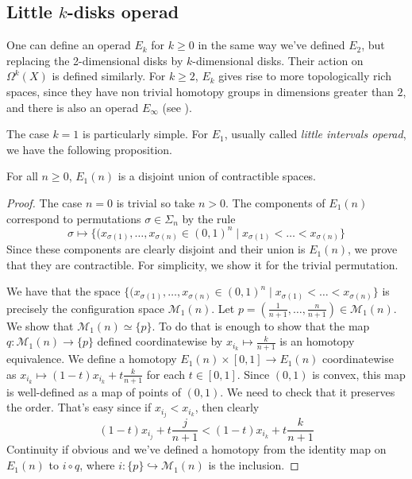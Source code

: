 \documentclass[TFM.tex]{subfiles}
\begin{document}
%
\subsection{Little $k$-disks operad}\label{intervals}

One can define an operad $E_k$ for $k\geq 0$ in the same way we've defined $E_2$, but replacing the 2-dimensional disks by $k$-dimensional disks. Their action on $\Omega^k(X)$ is defined similarly. For $k\geq 2$, $E_k$ gives rise to more topologically rich spaces, since they have non trivial homotopy groups in dimensions greater than $2$, and there is also an operad $E_\infty$ (see \cite{cuentas}). 

The case $k=1$ is particularly simple. For $E_1$, usually called \emph{little intervals operad}, we have the following proposition.

\begin{prop}\label{E1}
For all $n\geq 0$, $E_1(n)$ is a disjoint union of contractible spaces.
\end{prop}
\begin{proof}
The case $n=0$ is trivial so take $n>0$. The components of $E_1(n)$ correspond to permutations $\sigma\in\Sigma_n$ by the rule
\[
\sigma\mapsto \{(x_{\sigma(1)},\dots, x_{\sigma(n)}\in (0,1)^n\mid x_{\sigma(1)}<\dots< x_{\sigma(n)}\}
\]
Since these components are clearly disjoint and their union is $E_1(n)$, we prove that they are contractible. For simplicity, we show it for the trivial permutation. 

We have that the space $\{(x_{\sigma(1)},\dots, x_{\sigma(n)}\in (0,1)^n\mid x_{\sigma(1)}<\dots< x_{\sigma(n)}\}$  is precisely the configuration space $\mathcal{M}_1(n)$. Let $p=\left(\frac{1}{n+1},\dots, \frac{n}{n+1}\right)\in \mathcal{M}_1(n)$. We show that $\mathcal{M}_1(n)\simeq \{p\}$. To do that is enough to show that the map $q:\mathcal{M}_1(n)\to \{p\}$ defined coordinatewise by $x_{i_k}\mapsto \frac{k}{n+1}$ is an homotopy equivalence. We define a homotopy $E_1(n)\times [0,1]\to E_1(n)$ coordinatewise as $x_{i_k}\mapsto (1-t)x_{i_k}+t\frac{k}{n+1}$ for each $t\in [0,1]$. Since $(0,1)$ is convex, this map is well-defined as a map of points of $(0,1)$. We need to check that it preserves the order. That's easy since if $x_{i_j}<x_{i_k}$, then clearly 
\[
(1-t)x_{i_j}+t\frac{j}{n+1}<(1-t)x_{i_k}+t\frac{k}{n+1}
\] 
Continuity if obvious and we've defined a homotopy from the identity map on $E_1(n)$ to $i\circ q$, where $i:\{p\}\hookrightarrow \mathcal{M}_1(n)$ is the inclusion. 
\end{proof}
\end{document}
